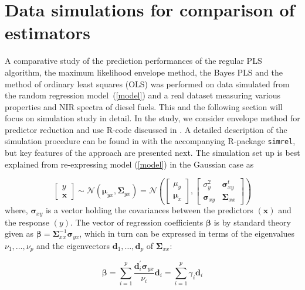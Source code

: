 \documentclass[num-refs]{wiley-article}
\begin{document}
\section{Data simulations for comparison of estimators}
\label{sec:data-simulation}

A comparative study of the prediction performances of the regular PLS algorithm,
the maximum likelihood envelope method, the Bayes PLS and the method of ordinary
least squares (OLS) was performed on data simulated from the random regression
model~(\ref{model}) and a real dataset measuring various properties and NIR
spectra of diesel fuels. This and the following section will focus on simulation study in detail. In the study, we consider envelope method for predictor reduction \citep{cook2013envelopes} and use R-code discussed in \citet{cook2016note}. A detailed description of the simulation procedure can be found in \citep{saebo2015simrel} with the accompanying R-package {\tt simrel}, but key features of the approach are presented next. The simulation set up is best explained from re-expressing model (\ref{model}) in the Gaussian case as

\begin{equation}
  \label{eq:rand-reg-model}
  \begin{bmatrix}
    y \\ \mathbf{x}
  \end{bmatrix} \sim
  \mathcal{N}\left( \boldsymbol{\mu}_{yx}, \boldsymbol{\Sigma}_{yx} \right) =
  \mathcal{N}\left(
    \begin{bmatrix}
      \mu_y \\ \boldsymbol{\mu}_x
    \end{bmatrix},
    \begin{bmatrix}
      \sigma_y^2               & \boldsymbol{\sigma}_{xy}^t \\
      \boldsymbol{\sigma}_{xy} & \boldsymbol{\Sigma}_{xx}
    \end{bmatrix}
  \right)
\end{equation}
where, $\boldsymbol{\sigma}_{xy}$ is a vector holding the covariances between the predictors $(\mathbf{x})$ and the response $(y)$. The vector of regression coefficients  $\boldsymbol{\beta}$ is by standard theory given as $\boldsymbol{\beta} = \boldsymbol{\Sigma}_{xx}^{-1}\boldsymbol{\sigma}_{yx}$, which in turn can be expressed in terms of the eigenvalues $\nu_1, \ldots, \nu_p$ and the eigenvectors $\bm{d}_1, \ldots, \bm{d}_p$ of $\boldsymbol{\Sigma}_{xx}$:

\begin{equation}
  \boldsymbol{\beta} = \sum_{i=1}^p \frac{\boldsymbol{d}_i^{'}\boldsymbol{\sigma}_{yx}}{\nu_i}\boldsymbol{d}_i = \sum_{i=1}^p\gamma_i \boldsymbol{d}_i
  \label{beta2}
\end{equation}
\end{document}
